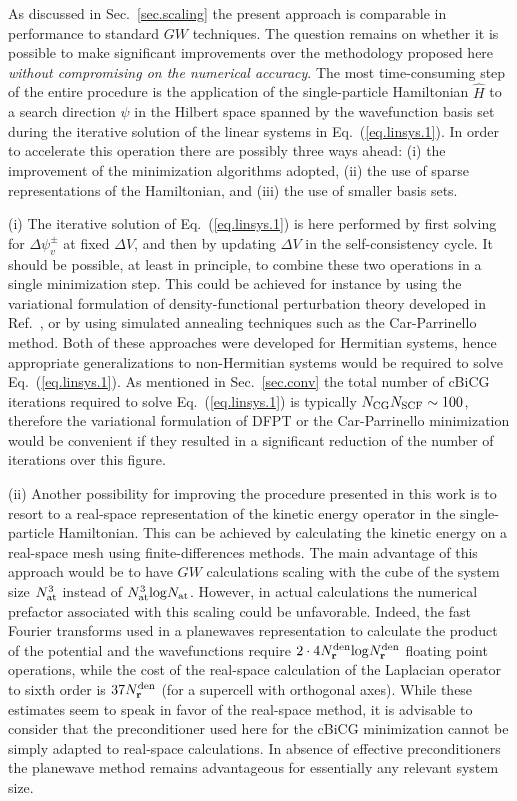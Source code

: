\documentclass[twocolumn,prb,showpacs,superscriptaddress]{revtex4}
\def\H{\hat{H}}
\def\r{{\bf r}}
\begin{document}
As discussed in Sec.\ \ref{sec.scaling} the present approach is comparable
in performance to standard\cite{hl86} $GW$ techniques.
The question remains on whether it is possible to make significant
improvements over the methodology proposed here {\it without compromising on
the numerical accuracy}. The most time-consuming
step of the entire procedure is the application of the single-particle
Hamiltonian $\H$ to a search direction $\psi$ in the Hilbert space spanned
by the wavefunction basis set during the iterative solution 
of the linear systems in Eq.\ (\ref{eq.linsys.1}). In order to accelerate
this operation there are possibly three ways ahead: (i) the improvement of the
minimization algorithms adopted, (ii) the use of sparse representations of
the Hamiltonian, and (iii) the use of smaller basis sets. 

(i) The iterative solution of Eq.\ (\ref{eq.linsys.1}) is here performed
by first solving for $\Delta\psi_v^\pm$ at fixed $\Delta V$, and then 
by updating $\Delta V$ in the self-consistency cycle.
It should be possible, at least in principle, to combine these two
operations in a single minimization step. This could be achieved
for instance by using the variational formulation of density-functional
perturbation theory developed in Ref.\ ,
or by using simulated annealing techniques such as the Car-Parrinello 
method.\cite{carparrinello} Both of these approaches were developed
for Hermitian systems, hence appropriate generalizations
to non-Hermitian systems would be required to solve Eq.\ (\ref{eq.linsys.1}).
As mentioned in Sec.\ \ref{sec.conv} the total number of cBiCG iterations
required to solve Eq.\ (\ref{eq.linsys.1}) is typically 
$N_{\rm CG} N_{\rm SCF}\sim 100$, therefore the variational formulation
of DFPT or the Car-Parrinello minimization would be convenient
if they resulted in a significant reduction of the number of iterations
over this figure.

(ii) Another possibility for improving the procedure presented in this work
is to resort to a real-space representation of the kinetic energy operator
in the single-particle Hamiltonian. This can be achieved by
calculating the kinetic energy on a real-space mesh using finite-differences
methods.\cite{chelikowsky} The main advantage of this approach would be
to have $GW$ calculations scaling with the cube of the system size
$N_{\rm at}^3$ instead of $N_{\rm at}^3 {\rm log} N_{\rm at}$.
However, in actual calculations the numerical prefactor associated with this scaling
could be unfavorable. Indeed, the fast Fourier transforms used in a planewaves
representation to calculate the product of the potential and the wavefunctions
require $2\cdot 4 N_\r^{\rm den} {\rm log} N_\r^{\rm den}$ floating point operations,
while the cost of the real-space calculation of the Laplacian operator
to sixth order is $37 N_\r^{\rm den}$
(for a supercell with orthogonal axes).\cite{chelikowsky} 
While these estimates seem to speak in favor of the real-space method,
it is advisable to consider that the preconditioner used here\cite{tpa} for the 
cBiCG minimization cannot be simply adapted to real-space calculations.
In absence of effective preconditioners the planewave method
remains advantageous for essentially any relevant system size.
\end{document}
